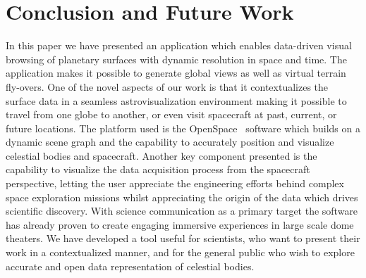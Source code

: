 \documentclass[journal]{vgtc}                %
\newcommand{\fig}[1]{Figure~\ref{fig:#1}}
\begin{document}


\section{Conclusion and Future Work} \label{sec:conclusion}
In this paper we have presented an application which enables data-driven visual browsing of planetary surfaces with dynamic resolution in space and time.
The application makes it possible to generate global views as well as virtual terrain fly-overs.
One of the novel aspects of our work is that it contextualizes the surface data in a seamless astrovisualization environment making it possible to travel from one globe to another, or even visit spacecraft at past, current, or future locations.
The platform used is the OpenSpace~\cite{Bock2017} software which builds on a dynamic scene graph and the capability to accurately position and visualize celestial bodies and spacecraft.
Another key component presented is the capability to visualize the data acquisition process from the spacecraft perspective, letting the user appreciate the engineering efforts behind complex space exploration missions whilst appreciating the origin of the data which drives scientific discovery.
With science communication as a primary target the software has already proven to create engaging immersive experiences in large scale dome theaters.
We have developed a tool useful for scientists, who want to present their work in a contextualized manner, and for the general public who wish to explore accurate and open data representation of celestial bodies.
\end{document}
